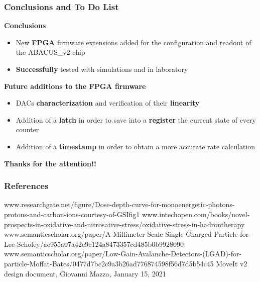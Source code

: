 \documentclass[aspectratio=169]{beamer}
\begin{document}
	\begin{frame}
	\frametitle{Conclusions and To Do List}
	\begin{center}
		{\color{blue}\textbf{Conclusions}}
	\end{center}
		\begin{itemize}
			\item New \textbf{FPGA} firmware extensions added for the configuration and readout of the ABACUS\_v2 chip
			\item \textbf{Successfully} tested with simulations and in laboratory
		\end{itemize}
	
	\begin{center}
		{\color{blue}\textbf{Future additions to the FPGA firmware}}
	\end{center}
		\begin{itemize}
			\item DACs \textbf{characterization} and verification of their \textbf{linearity}
			\item Addition of a \textbf{latch} in order to save into a \textbf{register} the current state of every counter 
			\item Addition of a \textbf{timestamp} in order to obtain a more accurate rate calculation 
		\end{itemize}
			\vspace{1 cm}
		\begin{center}
			\textbf{Thanks for the attention!!}
		\end{center}	
	\end{frame}

	\begin{frame}[noframenumbering]
	\frametitle{References}
	{\scriptsize 
	\begin{thebibliography}{00}
		www.researchgate.net/figure/Dose-depth-curve-for-monoenergetic-photons-protons-and-carbon-ions-courtesy-of-GSI\textunderscore fig1\textunderscore283521369
		\newline
		www.intechopen.com/books/novel-prospects-in-oxidative-and-nitrosative-stress/oxidative-stress-in-hadrontherapy
		\newline
		www.semanticscholar.org/paper/A-Millimeter-Scale-Single-Charged-Particle-for-Lee-Scholey/ae955a07a42e9c124a8473357cd485b0b9928090
		\newline
		www.semanticscholar.org/paper/Low-Gain-Avalanche-Detectors-(LGAD)-for-particle-Moffat-Bates/0477d7bc2c9a3b26ad776874598f56d7d5b54c45
		\newline
		MoveIt v2 design document, Giovanni Mazza, January 15, 2021
	\end{thebibliography} }
	\end{frame}
\end{document}
